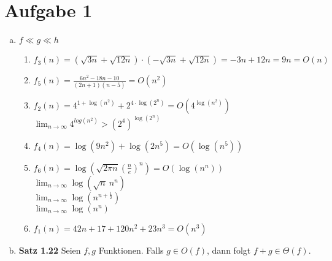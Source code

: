 \documentclass[a4paper,12pt]{scrartcl}
\begin{document}
\section*{Aufgabe 1}
\begin{enumerate}[a)]
	\item $f \ll g \ll h$ %
	\begin{enumerate}[1.]
		\item $f_3(n) = \left(\sqrt{3n} + \sqrt{12n}\right) \cdot \left(-\sqrt{3n} + \sqrt{12n}\right) = -3n + 12n = 9n = O(n)$
		\item $f_5(n) = \frac{6n^2-18n-10}{(2n+1)(n-5)} = O(n^2)$

		\item $f_2(n) = 4^{1 + \log(n^2)} + 2^{4 \cdot \log(2^n)} = O(4^{\log(n^2)})$\\
			  $\lim_{n \to \infty}4^{log(n^2)} > (2^4)^{\log(2^n)}$
		
		\item $f_4(n) = \log(9n^2) + \log(2n^5) = O(\log(n^5))$
		\item $f_6(n) = \log\left(\sqrt{2 \pi n}\left(\frac{n}{e}\right)^{\!n}\right) = O(\log(n^n))$\\
		$\lim_{n \to \infty}\log(\sqrt{n}\ n^n)$\\
		$\lim_{n \to \infty}\log(n^{n+\frac{1}{2}})$\\
		$\lim_{n \to \infty}\log(n^n)$
		
		\item $f_1(n) = 42n + 17 + 120n^2 + 23n^3 = O(n^3)$

			  
	\end{enumerate}

	\item \textbf{Satz 1.22} Seien $f, g$ Funktionen. Falls $g \in O(f)$, dann folgt $f + g \in \Theta(f)$.
\end{enumerate}
\end{document}
